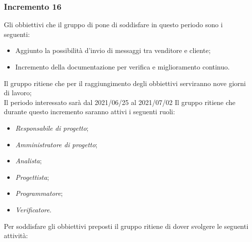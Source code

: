 \subsubsection{Incremento 16}
Gli obbiettivi che il gruppo di pone di soddisfare in questo periodo sono i seguenti:
\begin{itemize}
    \item Aggiunto la possibilità d'invio di messaggi tra venditore e cliente;
    \item Incremento della documentazione per verifica e miglioramento continuo.
\end{itemize}
Il gruppo ritiene che per il raggiungimento degli obbiettivi serviranno nove giorni di lavoro;\\
Il periodo interessato sarà dal 2021/06/25 al 2021/07/02
Il gruppo ritiene che durante questo incremento saranno attivi i seguenti ruoli:
\begin{itemize}
    \item \textit{Responsabile di progetto};
    \item \textit{Amministratore di progetto};
    \item \textit{Analista};
    \item \textit{Progettista};
    \item \textit{Programmatore};
    \item \textit{Verificatore}.
\end{itemize}
Per soddisfare gli obbiettivi preposti il gruppo ritiene di dover svolgere le seguenti attività:
